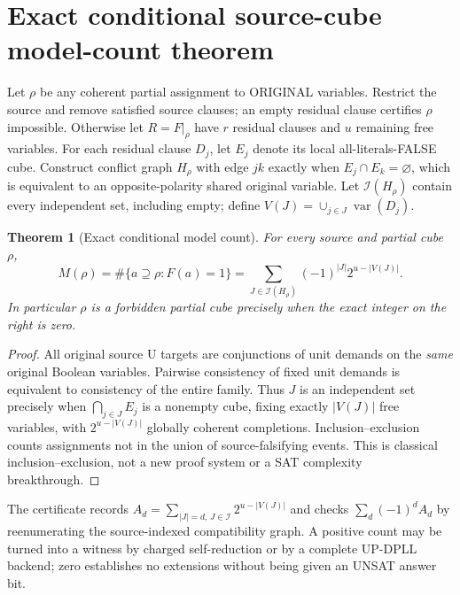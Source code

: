 \documentclass[10pt]{article}
\newtheorem{theorem}{Theorem}
\begin{document}
\section{Exact conditional source-cube model-count theorem}
Let $\rho$ be any coherent partial assignment to ORIGINAL variables. Restrict the source and remove satisfied source clauses; an empty residual clause certifies $\rho$ impossible. Otherwise let $R=F|_\rho$ have $r$ residual clauses and $u$ remaining free variables. For each residual clause $D_j$, let $E_j$ denote its local all-literals-FALSE cube. Construct conflict graph $H_\rho$ with edge $jk$ exactly when $E_j\cap E_k=\varnothing$, which is equivalent to an opposite-polarity shared original variable. Let $\mathcal I(H_\rho)$ contain every independent set, including empty; define $V(J)=\cup_{j\in J}\operatorname{var}(D_j)$.
\begin{theorem}[Exact conditional model count]
For every source and partial cube $\rho$,
\[
\boxed{M(\rho)=\#\{a\supseteq\rho:F(a)=1\}
=\sum_{J\in\mathcal I(H_\rho)}(-1)^{|J|}2^{u-|V(J)|}.}
\]
In particular $\rho$ is a forbidden partial cube precisely when the exact integer on the right is zero.
\end{theorem}
\begin{proof}
All original source U targets are conjunctions of unit demands on the \emph{same} original Boolean variables. Pairwise consistency of fixed unit demands is equivalent to consistency of the entire family. Thus $J$ is an independent set precisely when $\bigcap_{j\in J}E_j$ is a nonempty cube, fixing exactly $|V(J)|$ free variables, with $2^{u-|V(J)|}$ globally coherent completions. Inclusion--exclusion counts assignments not in the union of source-falsifying events. This is classical inclusion--exclusion, not a new proof system or a SAT complexity breakthrough.
\end{proof}
The certificate records $A_d=\sum_{|J|=d,\,J\in\mathcal I}2^{u-|V(J)|}$ and checks $\sum_d(-1)^dA_d$ by reenumerating the source-indexed compatibility graph. A positive count may be turned into a witness by charged self-reduction or by a complete UP-DPLL backend; zero establishes no extensions without being given an UNSAT answer bit.
\end{document}
